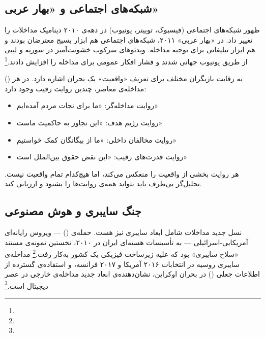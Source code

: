 {\subsection{شبکه‌های اجتماعی و «بهار عربی»}
\label{subsec:ch10-social-media}

ظهور شبکه‌های اجتماعی (فیسبوک، توییتر، یوتیوب) در دهه‌ی ۲۰۱۰ دینامیک مداخلات را تغییر داد. در «بهار عربی» ۲۰۱۱، شبکه‌های اجتماعی هم ابزار بسیج معترضان بودند و هم ابزار تبلیغاتی برای توجیه مداخله. ویدئوهای سرکوب خشونت‌آمیز در سوریه و لیبی از طریق یوتیوب جهانی شدند و فشار افکار عمومی برای مداخله را افزایش دادند.\footnote{}

\begin{tcolorbox}[defbox, title={مفهوم کلیدی: جنگ روایت‌ها}]
 () به رقابت بازیگران مختلف برای تعریف «واقعیت» یک بحران اشاره دارد. در هر مداخله‌ی معاصر، چندین روایت رقیب وجود دارد:
\begin{itemize}
\item روایت مداخله‌گر: «ما برای نجات مردم آمده‌ایم»
\item روایت رژیم هدف: «این تجاوز به حاکمیت ماست»
\item روایت مخالفان داخلی: «ما از بیگانگان کمک خواستیم»
\item روایت قدرت‌های رقیب: «این نقض حقوق بین‌الملل است»
\end{itemize}
هر روایت بخشی از واقعیت را منعکس می‌کند، اما هیچ‌کدام تمام واقعیت نیست. تحلیل‌گر بی‌طرف باید بتواند همه‌ی روایت‌ها را بشنود و ارزیابی کند.
\end{tcolorbox}

\subsection{جنگ سایبری و هوش مصنوعی}
\label{subsec:ch10-cyber}

نسل جدید مداخلات شامل ابعاد سایبری نیز هست. حمله‌ی  () — ویروس رایانه‌ای آمریکایی-اسرائیلی — به تأسیسات هسته‌ای ایران در ۲۰۱۰، نخستین نمونه‌ی مستند «سلاح سایبری» بود که علیه زیرساخت فیزیکی یک کشور به‌کار رفت.\footnote{} مداخله‌ی سایبری روسیه در انتخابات ۲۰۱۶ آمریکا و ۲۰۱۷ فرانسه، و استفاده‌ی گسترده از اطلاعات جعلی () در بحران اوکراین، نشان‌دهنده‌ی ابعاد جدید مداخله‌ی خارجی در عصر دیجیتال است.\footnote{}

}

